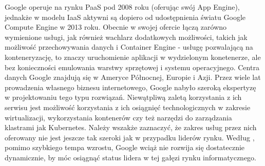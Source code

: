 \documentclass[12pt,a4paper,twoside]{article}
\begin{document}
Google operuje na rynku PaaS pod 2008 roku (oferując swój App Engine), jednakże w modelu IaaS aktywni są dopiero od udostępnienia światu Google Compute Engine w 2013 roku. Obecnie w swojej ofercie łączą zarówno wymienione usługi, jak również wachlarz dodatkowych możliwości, takich jak możliwość przechowywania danych i Container Engine - usługę pozwalającą na konteneryzację, to znaczy uruchomienie aplikacji w wydzielonym konetenerze, ale bez konieczności emulowania warstwy sprzętowej i systemu operacyjnego. Centra danych Google znajdują się w Ameryce Północnej, Europie i Azji. Przez wiele lat prowadzenia własnego biznesu internetowego, Google nabyło szeroką ekspertyzę w projektowaniu tego typu rozwiązań. Niewątpliwą zaletą korzystania z ich serwisu jest możliwość korzystania z ich osiągnięć technologicznych w zakresie wirtualizacji, wykorzystania kontenerów czy też narzędzi do zarządzania klastrami jak Kubernetes. Należy wszakże zaznaczyć, że zakres usług przez nich oferowany nie jest jeszcze tak szeroki jak w przypadku liderów rynku. Według \citet{leong2017}, pomimo szybkiego tempa wzrostu, Google wciąż nie rozwija się dostatecznie dynamicznie, by móc osiągnąć status lidera w tej gałęzi rynku informatycznego.




\clearpage
\end{document}
